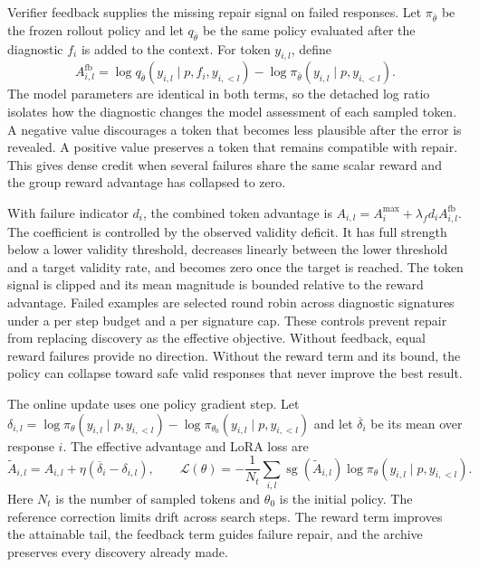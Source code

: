 \documentclass{article}
\newcommand{\sg}{\operatorname{sg}}
\begin{document}
Verifier feedback supplies the missing repair signal on failed responses. Let $\pi_{\bar\theta}$ be the frozen rollout policy and let $q_{\bar\theta}$ be the same policy evaluated after the diagnostic $f_i$ is added to the context. For token $y_{i,l}$, define
\begin{equation}
A^{\mathrm{fb}}_{i,l}
=
\log q_{\bar\theta}
\left(y_{i,l}\mid p,f_i,y_{i,<l}\right)
-
\log \pi_{\bar\theta}
\left(y_{i,l}\mid p,y_{i,<l}\right).
\label{eqfeedbackadvantage}
\end{equation}
The model parameters are identical in both terms, so the detached log ratio isolates how the diagnostic changes the model assessment of each sampled token. A negative value discourages a token that becomes less plausible after the error is revealed. A positive value preserves a token that remains compatible with repair. This gives dense credit when several failures share the same scalar reward and the group reward advantage has collapsed to zero.

With failure indicator $d_i$, the combined token advantage is $A_{i,l}=A_i^{\max}+\lambda_f d_i A^{\mathrm{fb}}_{i,l}$. The coefficient is controlled by the observed validity deficit. It has full strength below a lower validity threshold, decreases linearly between the lower threshold and a target validity rate, and becomes zero once the target is reached. The token signal is clipped and its mean magnitude is bounded relative to the reward advantage. Failed examples are selected round robin across diagnostic signatures under a per step budget and a per signature cap. These controls prevent repair from replacing discovery as the effective objective. Without feedback, equal reward failures provide no direction. Without the reward term and its bound, the policy can collapse toward safe valid responses that never improve the best result.

The online update uses one policy gradient step. Let $\delta_{i,l}=\log\pi_\theta(y_{i,l}\mid p,y_{i,<l})-\log\pi_{\theta_0}(y_{i,l}\mid p,y_{i,<l})$ and let $\overline\delta_i$ be its mean over response $i$. The effective advantage and LoRA loss are
\begin{equation}
\widetilde A_{i,l}
=
A_{i,l}+\eta\left(\overline\delta_i-\delta_{i,l}\right),
\qquad
\mathcal L(\theta)
=
-\frac{1}{N_t}
\sum_{i,l}
\sg\!\left(\widetilde A_{i,l}\right)
\log\pi_\theta\!\left(y_{i,l}\mid p,y_{i,<l}\right).
\label{eqpolicyupdate}
\end{equation}
Here $N_t$ is the number of sampled tokens and $\theta_0$ is the initial policy. The reference correction limits drift across search steps. The reward term improves the attainable tail, the feedback term guides failure repair, and the archive preserves every discovery already made.
\end{document}
